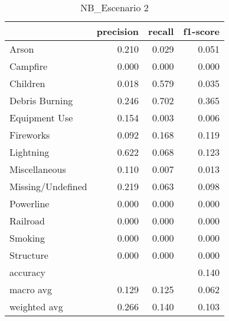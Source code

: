 \begin{table}
\centering
\caption{NB_Escenario 2}
\label{tab:Reporte de clasificación para el Escenario 2 utilizando Naïve Bayes}
\begin{tabular}{lrrr}
\toprule
{} &  precision &  recall &  f1-score \\
\midrule
Arson             &      0.210 &   0.029 &     0.051 \\
Campfire          &      0.000 &   0.000 &     0.000 \\
Children          &      0.018 &   0.579 &     0.035 \\
Debris Burning    &      0.246 &   0.702 &     0.365 \\
Equipment Use     &      0.154 &   0.003 &     0.006 \\
Fireworks         &      0.092 &   0.168 &     0.119 \\
Lightning         &      0.622 &   0.068 &     0.123 \\
Miscellaneous     &      0.110 &   0.007 &     0.013 \\
Missing/Undefined &      0.219 &   0.063 &     0.098 \\
Powerline         &      0.000 &   0.000 &     0.000 \\
Railroad          &      0.000 &   0.000 &     0.000 \\
Smoking           &      0.000 &   0.000 &     0.000 \\
Structure         &      0.000 &   0.000 &     0.000 \\
accuracy          &            &         &     0.140 \\
macro avg         &      0.129 &   0.125 &     0.062 \\
weighted avg      &      0.266 &   0.140 &     0.103 \\
\bottomrule
\end{tabular}
\end{table}
